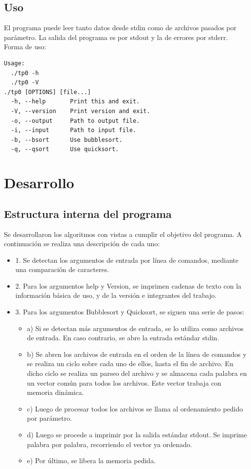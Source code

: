 \documentclass[a4paper,10pt]{article}
\begin{document}
\subsection{Uso}
El programa puede leer tanto datos desde stdin como de archivos pasados por par\'ametro. La salida del programa es por stdout y la de errores por stderr.
Forma de uso:
\begin{verbatim}
Usage:
  ./tp0 -h
  ./tp0 -V
./tp0 [OPTIONS] [file...]
  -h, --help       Print this and exit.
  -V, --version    Print version and exit.
  -o, --output     Path to output file.
  -i, --input      Path to input file.
  -b, --bsort      Use bubblesort.
  -q, --qsort      Use quicksort.
\end{verbatim}



\newpage
\section{Desarrollo}

\subsection{Estructura interna del programa}
Se desarrollaron los algoritmos con vistas a cumplir el objetivo del programa. A continuaci\'on se realiza una descripci\'on de cada uno:
\begin{itemize}
	\item 1. Se detectan los argumentos de entrada por l\'inea de comandos, mediante una comparaci\'on de caracteres.
	\item 2. Para los argumentos help y Version, se imprimen cadenas de texto con la informaci\'on b\'asica de uso, y de la versi\'on e integrantes del trabajo.
	\item 3. Para los argumentos Bubblesort y Quicksort, se siguen una serie de pasos:
	\begin{itemize}
		\item a) Si se detectan m\'as argumentos de entrada, se lo utiliza como archivos de entrada. En caso contrario, se abre la entrada est\'andar stdin.
		\item b) Se abren los archivos de entrada en el orden de la l\'inea de comandos y se realiza un ciclo sobre cada uno de ellos, hasta el fin de archivo. En dicho ciclo se realiza un parseo del archivo y se almacena cada palabra en un vector com\'un para todos los archivos. Este vector trabaja con memoria din\'amica.
		\item c) Luego de procesar todos los archivos se llama al ordenamiento pedido por par\'ametro.
		\item d) Luego se procede a imprimir por la salida est\'andar stdout. Se imprime palabra por palabra, recorriendo el vector ya ordenado.
		\item e) Por \'ultimo, se libera la memoria pedida.
	\end{itemize}
\end{itemize}
\end{document}
